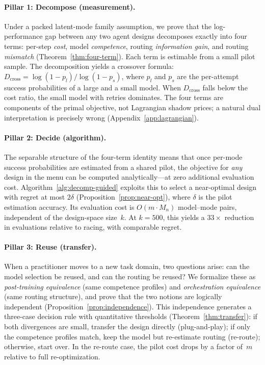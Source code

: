 \documentclass[11pt]{article}
\newcommand{\Mn}{M_n}
\begin{document}
\paragraph{Pillar 1: Decompose (measurement).}
Under a packed latent-mode family assumption, we prove that the
log-performance gap between any two agent designs decomposes exactly into
four terms: per-step \emph{cost}, model \emph{competence}, routing
\emph{information gain}, and routing \emph{mismatch}
(Theorem~\ref{thm:four-term}).  Each term is estimable from a small pilot
sample.  The decomposition yields a crossover formula:
$D_{\mathrm{cross}} = \log(1-p_l)/\log(1-p_s)$, where $p_l$ and $p_s$ are
the per-attempt success probabilities of a large and a small model.  When
$D_{\mathrm{cross}}$ falls below the cost ratio, the small model with
retries dominates.  The four terms are components of the primal objective,
not Lagrangian shadow prices; a natural dual interpretation is precisely
wrong (Appendix~\ref{app:lagrangian}).

\paragraph{Pillar 2: Decide (algorithm).}
The separable structure of the four-term identity means that once per-mode
success probabilities are estimated from a shared pilot, the objective for
\emph{any} design in the menu can be computed analytically---at zero
additional evaluation cost.
Algorithm~\ref{alg:decomp-guided} exploits this to select a near-optimal
design with regret at most $2\delta$ (Proposition~\ref{prop:near-opt}),
where $\delta$ is the pilot estimation accuracy.
Its evaluation cost is $O(m \cdot \Mn)$ model--mode pairs, independent of
the design-space size~$k$.
At $k{=}500$, this yields a $33\times$ reduction in evaluations relative to
racing, with comparable regret.

\paragraph{Pillar 3: Reuse (transfer).}
When a practitioner moves to a new task domain, two questions arise: can the
model selection be reused, and can the routing be reused?  We formalize
these as \emph{post-training equivalence} (same competence profiles) and
\emph{orchestration equivalence} (same routing structure), and prove that
the two notions are logically independent
(Proposition~\ref{prop:independence}).
This independence generates a three-case decision rule with quantitative
thresholds (Theorem~\ref{thm:transfer}): if both divergences are small,
transfer the design directly (plug-and-play); if only the competence
profiles match, keep the model but re-estimate routing (re-route);
otherwise, start over.  In the re-route case, the pilot cost drops by a
factor of~$m$ relative to full re-optimization.
\end{document}
